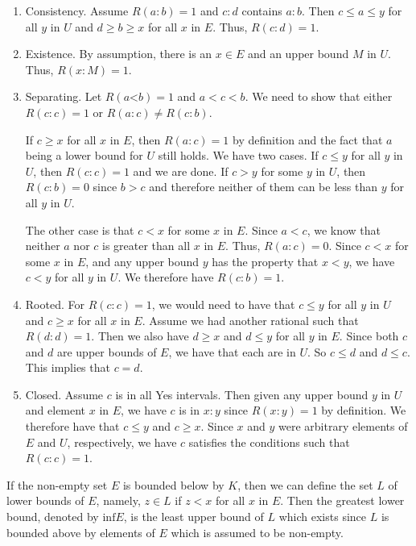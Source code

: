 \documentclass[12pt]{article}
\theoremstyle{remark}
\newcommand{\lt}{\mathord{<}}
\begin{document}
\begin{enumerate}
    \item Consistency. Assume $R(a:b)=1$ and $c:d$ contains $a:b$. Then $c \leq a \leq y$ for all $y$ in $U$ and $d \geq b \geq x$ for all $x$ in $E$. Thus, $R(c:d) = 1$.
    \item Existence. By assumption, there is an $x \in E$ and an upper bound $M$ in $U$. Thus, $R(x:M) = 1$. 
    \item Separating. Let $R(a\lt b)=1$ and $a < c< b$. We need to show that either $R(c:c)=1$ or $R(a:c) \neq R(c:b)$. 
    
    If $c \geq x$ for all $x$ in $E$, then $R(a:c)=1$ by definition and the fact that $a$ being a lower bound for $U$ still holds. We have two cases.  If $c \leq y$ for all $y$ in $U$, then $R(c:c)=1$ and we are done. If $c > y$ for some $y$ in $U$, then $R(c:b) = 0$ since $b > c$ and therefore neither of them can be less than $y$ for all $y$ in $U$. 
    
    The other case is that $c < x$ for some $x$ in $E$. Since $a < c$, we know that neither $a$ nor $c$ is greater than all $x$ in $E$. Thus, $R(a:c) = 0$. Since $c < x$ for some $x$ in $E$, and any upper bound $y$ has the property that $x < y$, we have $c < y$ for all $y$ in $U$. We therefore have $R(c:b)=1$.
    
    \item Rooted. For $R(c:c)=1$, we would need to have that $c \leq y$ for all $y$ in $U$ and $c \geq x$ for all $x$ in $E$. Assume we had another rational such that $R(d:d) = 1$. Then we also have $d \geq x$ and $d \leq y$ for all $y$ in $E$. Since both $c$ and $d$ are upper bounds of $E$, we have that each are in $U$. So $c \leq d$ and $d \leq c$. This implies that $c = d$. 
    \item Closed. Assume $c$ is in all Yes intervals. Then given any upper bound $y$ in $U$ and element $x$ in $E$, we have $c$ is in $x:y$ since $R(x:y)=1$ by definition. We therefore have that $c \leq y$ and $c \geq x$. Since $x$ and $y$ were arbitrary elements of $E$ and $U$, respectively, we have $c$ satisfies the conditions such that $R(c:c)=1$.
\end{enumerate}

If the non-empty set $E$ is bounded below by $K$, then we can define the set $L$ of lower bounds of $E$, namely, $z \in L$ if $z < x$ for all $x$ in $E$. Then the greatest lower bound, denoted by $\mathrm{inf} E$, is the least upper bound of $L$ which exists since $L$ is bounded above by elements of $E$ which is assumed to be non-empty. 
\end{document}
